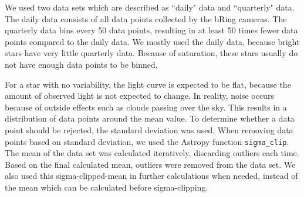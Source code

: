 \documentclass{aa}
\begin{document}
We used two data sets which are described as ``daily" data and ``quarterly" data. The daily data consists of all data points collected by the bRing cameras. The quarterly data bins every 50 data points, resulting in at least 50 times fewer data points compared to the daily data. We mostly used the daily data, because bright stars have very little quarterly data. Because of saturation, these stars usually do not have enough data points to be binned. 

For a star with no variability, the light curve is expected to be flat, because the amount of observed light is not expected to change. In reality, noise occurs because of outside effects such as clouds passing over the sky. This results in a distribution of data points around the mean value. To determine whether a data point should be rejected, the standard deviation was used. When removing data points based on standard deviation, we used the Astropy function \texttt{sigma\_clip}. The mean of the data set was calculated iteratively, discarding outliers each time. Based on the final calculated mean, outliers were removed from the data set. We also used this sigma-clipped-mean in further calculations when needed, instead of the mean which can be calculated before sigma-clipping.
\end{document}
